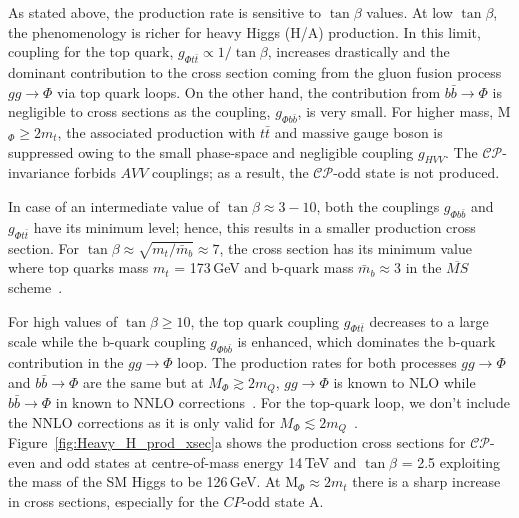 As stated above, the production rate is sensitive to $\tan\beta$ values. At low $\tan\beta$, the phenomenology is richer for heavy Higgs (H/A) production. In this limit, coupling for the top quark, $g_{\Phi t\bar{t}} \propto 1/\tan\beta$, increases drastically and the dominant contribution to the cross section coming from the gluon fusion process $gg\rightarrow \Phi$ via top quark loops. On the other hand, the contribution from $b\bar{b}\rightarrow \Phi$ is negligible to cross sections as the coupling, $g_{\Phi b\bar{b}}$, is very small. For higher mass, M$_{\Phi} \geq 2m_{t}$, the associated production with $t\bar{t}$ and massive gauge boson is suppressed owing to the small phase-space and negligible coupling $g_{HVV}$. The $\mathcal{CP}$-invariance forbids $AVV$ couplings; as a result, the $\mathcal{CP}$-odd state is not produced. 

In case of an intermediate value of $\tan\beta \approx 3-10$, both the couplings $g_{\Phi b\bar{b}}$ and $g_{\Phi t\bar{t}}$ have its minimum level; hence, this results in a smaller production cross section. For $\tan\beta \approx \sqrt{m_{t}/\bar{m}_{b}} \approx 7$, the cross section has its minimum value where top quarks mass $m_{t}$ = 173\,GeV and b-quark mass $\bar{m}_{b}\approx 3$ in the $\overline{MS}$ scheme~\cite{Baglio:2015wcg}. 

For high values of $\tan\beta \geq 10$, the top quark coupling $g_{\Phi t\bar{t}}$ decreases to a large scale while the b-quark coupling $g_{\Phi b\bar{b}}$ is enhanced, which dominates the b-quark contribution in the $gg\rightarrow \Phi$ loop. The production rates for both processes $gg\rightarrow \Phi$ and $b\bar{b}\rightarrow \Phi$ are the same but at $M_{\Phi} \gtrsim 2m_{Q}$, $gg\rightarrow \Phi$ is known to NLO while $b\bar{b}\rightarrow \Phi$ in known to NNLO corrections~\cite{Harlander:2003ai}. For the top-quark loop, we don't include the NNLO corrections as it is only valid for $M_{\Phi} \lesssim 2m_{Q}$~\cite{Dittmaier:2011ti}. Figure~\ref{fig:Heavy_H_prod_xsec}a shows the production cross sections for $\mathcal{CP}$-even and odd states at centre-of-mass energy 14\,TeV and $\tan\beta$ = 2.5 exploiting the mass of the SM Higgs to be 126\,GeV. At M$_{\Phi} \approx 2m_{t}$ there is a sharp increase in cross sections, especially for the $CP$-odd state A.     

